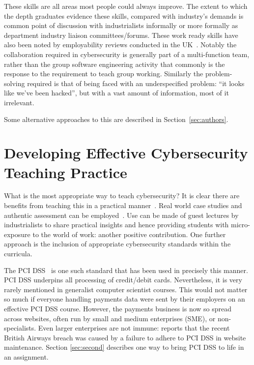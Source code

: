 \documentclass[conference]{IEEEtran}
\begin{document}
These skills are all areas most people could always improve. The extent to which the depth graduates evidence these skills, compared with industry's demands is common point of discussion with industrialists informally or more formally as department industry liaison committees/forums. These work ready skills have also been noted by employability reviews conducted in the UK~\cite{shadbolt2016shadbolt,wakeham}. Notably the collaboration required in cybersecurity is generally part of a multi-function team, rather than the group software engineering activity that commonly is the response to the requirement to teach group working. Similarly the problem-solving required is that of being faced with an underspecified problem: ``it looks like we've been hacked'', but with a vast amount of information, most of it irrelevant.

Some alternative approaches to this are described in Section~\ref{sec:authors}.

\section{Developing Effective Cybersecurity Teaching Practice}\label{practice}

What is the most appropriate way to teach cybersecurity? It is clear
there are benefits from teaching this in a practical
manner~\cite{Weiss:2013:THC:2527148.2527180}. Real world case studies
and authentic assessment can be
employed~\cite[e.g.]{BritishAirways2018a,Zoom2020a}. Use can be made
of guest lectures by industrialists to share practical insights and
hence providing students with micro-exposure to the world of work:
another positive contribution. One further approach is the inclusion
of appropriate cybersecurity standards within the curricula.

The PCI DSS~\cite{PCI2018b} is one such standard that has been used in
precisely this manner. PCI DSS underpins all processing of
credit/debit cards. Nevertheless, it is very rarely mentioned in
generalist computer scientist courses. This would not matter so much
if everyone handling payments data were sent by their employers on an
effective PCI DSS course. However, the payments business is now so
spread across websites, often run by small and medium enterprises
(SME), or non-specialists. Even larger enterprises are not immune:
\cite{BritishAirways2018a} reports that the recent British Airways
breach was caused by a failure to adhere to PCI DSS in website
maintenance. Section \ref{sec:second} describes one way to bring PCI
DSS to life in an assignment.
\end{document}
